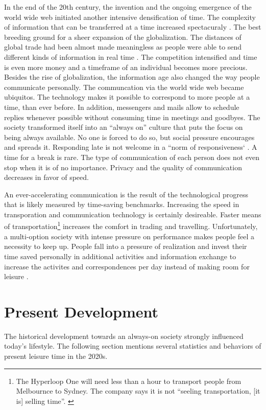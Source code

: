 \documentclass[12pt,numbers=noenddot,parskip,bibliography=totocnumbered,listof=totocnumbered,draft=true]{scrreprt}
\begin{document}
In the end of the 20th century, the invention and the ongoing emergence of the world wide web initiated another intensive densification of time. The complexity of information that can be transferred at a time increased spectacuraly \citep[p.45]{wajcman2014}. The best breeding ground for a sheer expansion of the globalization. The distances of global trade had been almost made meaningless as people were able to send different kinds of information in real time \citep[p.17]{wajcman2014}. The competition intensified and time is even more money and a timeframe of an individual becomes more precious. Besides the rise of globalization, the information age also changed the way people communicate personally. The communcation via the world wide web became ubiquitos. The technology makes it possible to correspond to more people at a time, than ever before. In addition, messengers and mails allow to schedule replies whenever possible without consuming time in meetings and goodbyes. The society transformed itself into an ``always on'' culture that puts the focus on being always available. No one is forced to do so, but social pressure encourages and spreads it. Responding late is not welcome in a ``norm of responsiveness` \citep[p.96]{wajcman2014}. A time for a break is rare. The type of communication of each person does not even stop when it is of no importance. Privacy and the quality of communication decreases in favor of speed.

An ever-accelerating communication is the result of the technological progress that is likely measured by time-saving benchmarks. Increasing the speed in transporation and communication technology is certainly desireable. Faster means of transportation\footnote{The Hyperloop One will need less than a hour to transport people from Melbournce to Sydney. The company says it is not ``seeling transportation, [it is] selling time''. \cite{hyperloop2017}} increases the comfort in trading and travelling. Unfortunately, a multi-option society with intense pressure on performance makes people feel a necessity to keep up. People fall into a pressure of realization and invest their time saved personally in additional activities and information exchange to increase the activites and correspondences per day instead of making room for leisure \citep[p.27-30]{gross1994}.

\section{Present Development}
The historical development towards an always-on society strongly influenced today's lifestyle. The following section mentions several statistics and behaviors of present leisure time in the 2020s.
\end{document}

